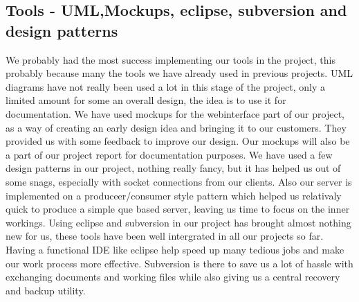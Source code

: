 \subsection*{Tools - UML,Mockups, eclipse, subversion and design patterns}
We probably had the most success implementing our tools in the project, this probably because many the tools we have already used in previous projects.
UML diagrams have not really been used a lot in this stage of the project, only a limited amount for some an overall design, the idea is to use it for documentation.
We have used mockups for the webinterface part of our project, as a way of creating an early design idea and bringing it to our customers.
They provided us with some feedback to improve our design. Our mockups will also be a part of our project report for documentation purposes.
We have used a few design patterns in our project, nothing really fancy, but it has helped us out of some snags, especially with socket connections from our clients.
Also our server is implemented on a produceer/consumer style pattern which helped us relativaly quick to produce a simple que based server, leaving us time to focus on the inner workings.
Using eclipse and subversion in our project has brought almost nothing new for us, these tools have been well intergrated in all our projects so far. Having a functional IDE like eclipse
help speed up many tedious jobs and make our work process more effective. Subversion is there to save us a lot of hassle with exchanging documents and working files while also giving us a central recovery
and backup utility.
